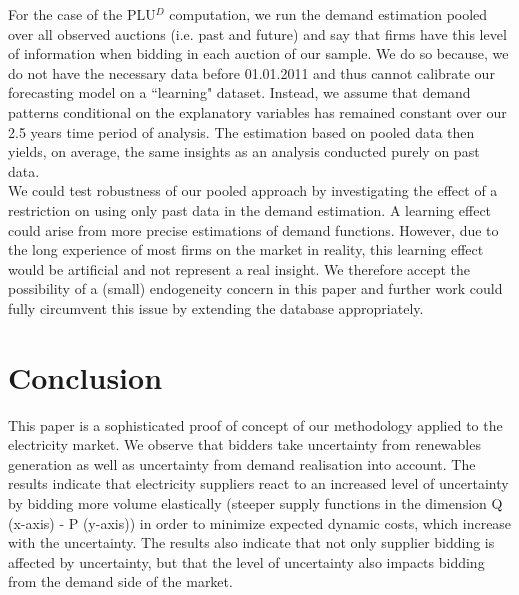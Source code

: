 For the case of the PLU$^D$ computation,  we run the demand estimation pooled over all observed auctions (i.e. past and future) and say that firms have this level of information when bidding in each auction of our sample. We do so because, we do not have the necessary data before 01.01.2011 and thus cannot calibrate our forecasting model on a ``learning" dataset. Instead, we assume that demand patterns conditional on the explanatory variables has remained constant over our 2.5 years time period of analysis. 
The estimation based on pooled data then yields, on average, the same insights as an analysis conducted purely on past data. \\


We could test robustness of our pooled approach by investigating the effect of a restriction on using only past data in the demand estimation. A learning effect could arise from more precise estimations of demand functions. However, due to the long experience of most firms on the market in reality, this learning effect would be artificial and not represent a real insight. We therefore accept the possibility of a (small) endogeneity concern in this paper and further work could fully circumvent this issue by extending the database appropriately. \\


\section{Conclusion}
\label{conclusion}
This paper is a sophisticated proof of concept of our methodology applied to the electricity market. We observe that bidders take uncertainty from renewables generation as well as uncertainty from demand realisation into account. The results indicate that electricity suppliers react to an increased level of uncertainty by bidding more volume elastically (steeper supply functions in the dimension Q (x-axis) - P (y-axis)) in order to minimize expected dynamic costs, which increase with the uncertainty. The results also indicate that not only supplier bidding is affected by uncertainty, but that the level of uncertainty also impacts bidding from the demand side of the market.\\ 

